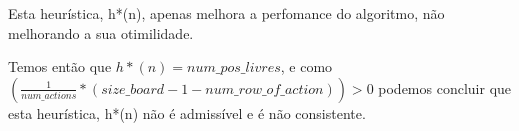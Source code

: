 \documentclass[12pt,a4paper]{article}
\begin{document}
  Esta heurística, h*(n), apenas melhora a perfomance do algoritmo, não melhorando a sua otimilidade.

  Temos então que $h*(n) = num\_pos\_livres$, e como $(\frac{1}{num\_actions} * (size\_board - 1 - num\_row\_of\_action)) > 0$ podemos concluir que esta heurística, h*(n) não é admissível e é não consistente.
\end{document}
